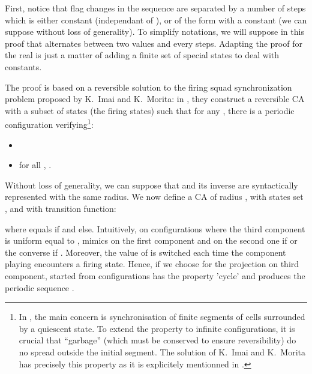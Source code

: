 \documentclass[a4paper]{elsarticle}
\begin{document}
\begin{pf}
  First, notice that flag changes in the sequence  are
  separated by a number of steps which is either constant (independant
  of ), or of the form  with  a constant (we can suppose
   without loss of generality). To simplify notations, we
  will suppose in this proof that  alternates between two
  values  and  every  steps. Adapting the proof for the
  real  is just a matter of adding a finite set of
  special states to deal with constants.
  
  The proof is based on a reversible solution  to the firing
  squad synchronization problem proposed by K.~Imai and K.~Morita: in
  \cite{ImaMor96}, they construct a reversible CA  with a
  subset of states  (the firing states) such that for any ,
  there is a periodic configuration  verifying\footnote{In
    \cite{ImaMor96}, the main concern is synchronisation of finite
    segments of cells surrounded by a quiescent state. To extend the
    property to infinite configurations, it is crucial that
    ``garbage'' (which must be conserved to ensure reversibility) do
    no spread outside the initial segment. The solution of K.~Imai and
    K.~Morita has precisely this property as it is explicitely
    mentionned in \cite{ImaMor96}.}:
  \begin{itemize}
  \item 
  \item  for all ,
    .
  \end{itemize}
  
  Without loss of generality, we can suppose that  and its
  inverse are syntactically represented with the same radius.  We now
  define a CA  of radius , with states set
  , and with
  transition function:
  
  where  equals  if  and  else. Intuitively, on
  configurations where the third component is uniform equal to , 
  mimics  on the first component and  on the second one if
   or the converse if . Moreover, the value of  is switched
  each time the component playing  encounters a firing state. Hence, if we
  choose for  the projection on third component,  started from
  configurations  has the property 'cycle' and produces the periodic
  sequence .


\end{pf}
\end{document}
